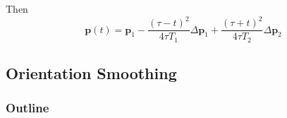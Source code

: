 \documentclass[10pt, aspectratio=169]{beamer}
\theoremstyle{remark}
\theoremstyle{definition}
\begin{document}
\begin{frame}[allowframebreaks]
Then
\begin{equation}
    \mathbf{p}(t) = \mathbf{p}_1 - \frac{(\tau - t)^2}{4\tau T_1} \Delta \mathbf{p}_1 + \frac{(\tau + t)^2}{4\tau T_2} \Delta \mathbf{p}_2
    \label{eq:p_smooth}
\end{equation}

\end{frame}

\subsection{Orientation Smoothing}
\begin{frame}
	\frametitle{Outline} %
\end{frame}
\end{document}
